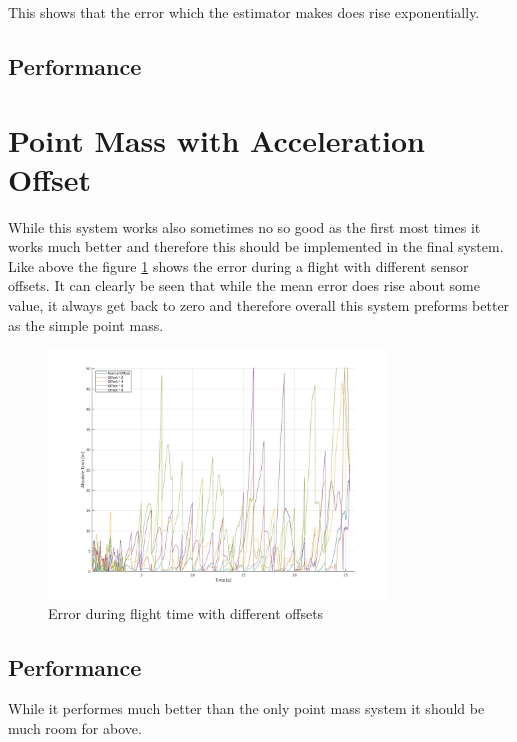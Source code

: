 This shows that the error which the estimator makes does rise exponentially.

\subsection{Performance}


\section{Point Mass with Acceleration Offset}
While this system works also sometimes no so good as the first most times it works much better and therefore this should be implemented in the final system.
Like above the figure \ref{fig:PointMassOffsetErrorWithOffset} shows the error during a flight with different sensor offsets.
It can clearly be seen that while the mean error does rise about some value, it always get back to zero and therefore overall this system preforms better as the simple point mass.

\begin{figure}[h!]
 \centering
 \includegraphics[width=0.8\textwidth]{./Pictures/PointMassOffsetErrorWithOffset.jpg}
  \caption{Error during flight time with different offsets}
 \label{fig:PointMassOffsetErrorWithOffset}
\end{figure}
 
\subsection{Performance}
While it performes much better than the only point mass system it should be much room for above.


